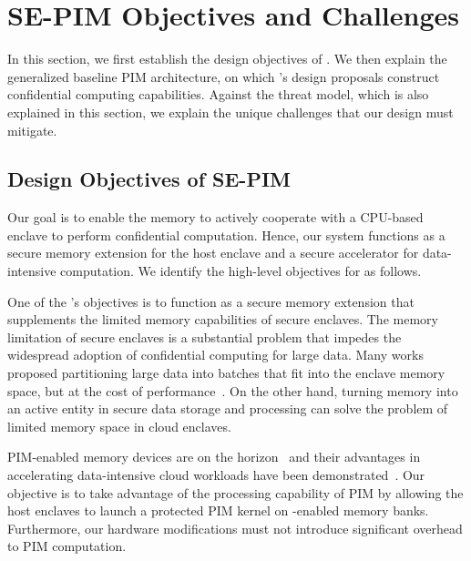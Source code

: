 \section{SE-PIM Objectives and Challenges}
In this section, we first establish the design objectives of \thename. We then explain the generalized baseline PIM architecture, on which \thename's design proposals construct confidential computing capabilities. Against the threat model, which is also explained in this section, we explain the unique challenges that our design must mitigate. 





\subsection{Design Objectives of SE-PIM}
\label{subsec:objectives}
Our goal is to enable the memory to actively cooperate with a CPU-based enclave to perform confidential computation. Hence, our system functions as a secure memory extension for the host enclave and a secure accelerator for data-intensive computation. We identify the high-level objectives for \thename as follows. 

 \label{g2} 
One of the \thename's objectives is to function as a secure memory extension that supplements the limited memory capabilities of secure enclaves. The memory limitation of secure enclaves is a substantial problem that impedes the widespread adoption of confidential computing for large data. Many works proposed partitioning large data into batches that fit into the enclave memory space, but at the cost of performance~\cite{bigmatrix,occulemency}. On the other hand, turning memory into an active entity in secure data storage and processing can solve the problem of limited memory space in cloud enclaves. 



 \label{g3} 
PIM-enabled memory devices are on the horizon~\cite{samsung-pim,amd-hbm,upmem,pim-architecture} and their advantages in accelerating data-intensive cloud workloads have been demonstrated~\cite{upmem-atc,upmem-benchmark,scalable-pim-acc,nda,pim-architecture}. Our objective is to take advantage of the processing capability of PIM by allowing the host enclaves to launch a protected PIM kernel on \thename-enabled memory banks. Furthermore, our hardware modifications must not introduce significant overhead to PIM computation.
 
